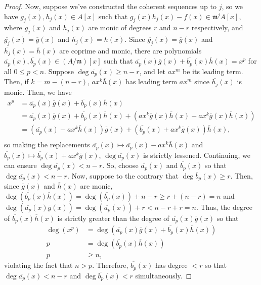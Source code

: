 \begin{proof}
Now, suppose we've constructed the coherent sequences up to $j$, so we have $g_j(x), h_j(x) \in A[x]$ such that $g_j(x)h_j(x) - f(x) \in \mathfrak{m}^j A[x]$, 
where $g_j(x)$ and $h_j(x)$ are monic of degrees $r$ and $n-r$ respectively, and $\overline{g_j}(x) = \overline{g}(x)$ and $\overline{h_j}(x) = \overline{h}(x)$.
Since $\overline{g_j}(x) = \overline{g}(x)$ and $\overline{h_j}(x) = \overline{h}(x)$ are coprime and monic, there are polynomials 
$\overline{a_p}(x), \overline{b_p}(x) \in (A/\mathfrak{m})[x]$ such that $\overline{a_p}(x)\overline{g}(x) + \overline{b_p}(x)\overline{h}(x) = x^p$ for all 
$0 \le p < n$. Suppose $\deg\overline{a_p}(x) \ge n-r$, and let $a x^m$ be its leading term. Then, if $k = m - (n-r)$, $a x^k \overline{h}(x)$ has leading term 
$a x^m$ since $\overline{h_j}(x)$ is monic. Then, we have
\begin{align*}
x^p &= \overline{a_p}(x)\overline{g}(x) + \overline{b_p}(x)\overline{h}(x) \\
&= \overline{a_p}(x)\overline{g}(x) + \overline{b_p}(x)\overline{h}(x) + (a x^k \overline{g}(x)\overline{h}(x) - a x^k \overline{g}(x)\overline{h}(x)) \\
&= (\overline{a_p}(x) - a x^k \overline{h}(x))\overline{g}(x) + (\overline{b_p}(x) + a x^k \overline{g}(x))\overline{h}(x), \\
\end{align*}
so making the replacements $\overline{a_p}(x) \mapsto \overline{a_p}(x) - a x^k \overline{h}(x)$ and 
$\overline{b_p}(x) \mapsto \overline{b_p}(x) + a x^k \overline{g}(x)$, $\deg \overline{a_p}(x)$ is strictly lessened. Continuing, we can ensure
$\deg \overline{a_p}(x) < n-r$. So, choose $\overline{a_p}(x)$ and $\overline{b_p}(x)$ so that $\deg \overline{a_p}(x) < n-r$. Now, suppose 
to the contrary that $\deg \overline{b}_p(x) \ge r$. Then, since $\overline{g}(x)$ and $\overline{h}(x)$ are monic,
$\deg(\overline{b_p}(x)\overline{h}(x)) = \deg(\overline{b_p}(x)) + n-r \ge r + (n-r) = n$
and $\deg(\overline{a_p}(x)\overline{g}(x)) = \deg(\overline{a_p}(x)) + r < n-r + r = n$. Thus, the degree of $\overline{b_p}(x)\overline{h}(x)$
is strictly greater than the degree of $\overline{a_p}(x)\overline{g}(x)$ so that
\begin{align*}
\deg(x^p) &= \deg(\overline{a_p}(x)\overline{g}(x) + \overline{b_p}(x)\overline{h}(x)) \\
p &= \deg(\overline{b_p}(x)\overline{h}(x)) \\
p &\ge n,
\end{align*}
violating the fact that $n > p$. Therefore, $\overline{b_p}(x)$ has degree $< r$ so that $\deg \overline{a_p}(x) < n-r$ and 
$\deg \overline{b_p}(x) < r$ simultaneously.


\end{proof}
